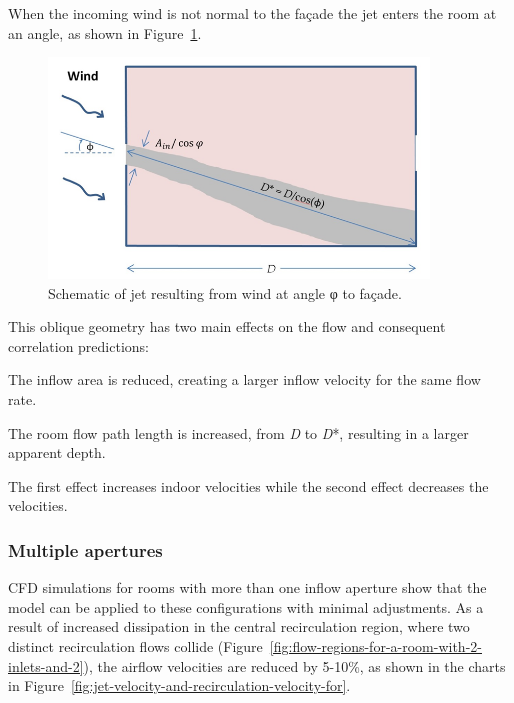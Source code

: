When the incoming wind is not normal to the façade the jet enters the room at an angle, as shown in Figure~\ref{fig:schematic-of-jet-resulting-from-wind-at-angle}.

\begin{figure}[hbtp] %
\centering
\includegraphics[width=0.9\textwidth, height=0.9\textheight, keepaspectratio=true]{media/image2659.png}
\caption{Schematic of jet resulting from wind at angle φ to façade. \protect \label{fig:schematic-of-jet-resulting-from-wind-at-angle}}
\end{figure}

This oblique geometry has two main effects on the flow and consequent correlation predictions:

The inflow area is reduced, creating a larger inflow velocity for the same flow rate.

The room flow path length is increased, from \emph{D} to \emph{D}*, resulting in a larger apparent depth.

The first effect increases indoor velocities while the second effect decreases the velocities.

\subsubsection{Multiple apertures}\label{multiple-apertures}

CFD simulations for rooms with more than one inflow aperture show that the model can be applied to these configurations with minimal adjustments. As a result of increased dissipation in the central recirculation region, where two distinct recirculation flows collide (Figure~\ref{fig:flow-regions-for-a-room-with-2-inlets-and-2}), the airflow velocities are reduced by 5-10\%, as shown in the charts in Figure~\ref{fig:jet-velocity-and-recirculation-velocity-for}.


